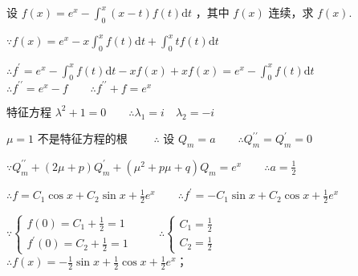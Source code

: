 \begin{problem}[points = 7]
设 $f(x) = e^x - \int_{0}^{x} (x - t)f(t)\mathrm{d}t$ ，其中 $f(x)$ 连续，求 $f(x)$.
\end{problem}
\begin{solution}
    $\because f(x) = e^x - x\int_{0}^{x} f(t)\mathrm{d}t + \int_{0}^{x} tf(t)\mathrm{d}t$

    $\therefore f^{\prime} = e^x - \int_{0}^{x} f(t)\mathrm{d}t - xf(x) + xf(x) = e^x - \int_{0}^{x} f(t)\mathrm{d}t \qquad$
    $\therefore f^{\prime\prime} = e^x - f \qquad \therefore f^{\prime\prime} + f = e^x$

    特征方程 $\lambda^2 + 1 = 0 \qquad \therefore \lambda_1 = i \quad \lambda_2 = -i$

    $\mu = 1$ 不是特征方程的根 $\qquad \therefore$ 设 $Q_m = a \qquad \therefore Q_m^{\prime\prime} = Q_m^{\prime} = 0$

    $\because Q_m^{\prime\prime} + (2\mu + p)Q_m^{\prime} + (\mu^2 + p\mu + q)Q_m = e^x \qquad \therefore a = \frac{1}{2}$

    $\therefore f = C_1\cos{x} + C_2\sin{x} + \frac{1}{2}e^x \qquad \therefore f^{\prime} = -C_1\sin{x} + C_2\cos{x} + \frac{1}{2}e^x$

    $\because \begin{cases}
            f(0) = C_1 + \frac{1}{2} = 1 \\
            f^{\prime}(0) = C_2 + \frac{1}{2} = 1
        \end{cases} \qquad$
    $\therefore \begin{cases}
            C_1 = \frac{1}{2} \\
            C_2 = \frac{1}{2}
        \end{cases} \qquad$
    $\therefore f(x) = -\frac{1}{2}\sin{x} + \frac{1}{2}\cos{x} + \frac{1}{2}e^x$；
\end{solution}

